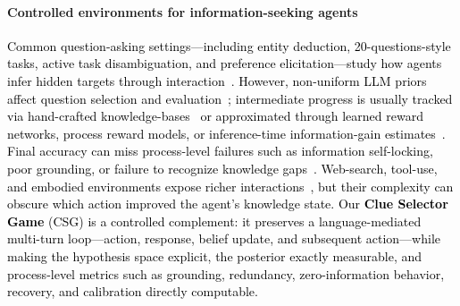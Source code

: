 \documentclass[11pt]{article}
\newcommand{\an}[1]{\textcolor{black}{#1}}
\theoremstyle{plain}
\theoremstyle{definition}
\theoremstyle{remark}
\begin{document}
 
\vspace*{-3mm}
\paragraph{Controlled environments for information-seeking agents}
 
\an{Common question-asking settings---including entity deduction, 20-questions-style tasks, active task disambiguation, and preference elicitation---study how agents infer hidden targets through interaction~\citep{andukuri2024stargateteachinglanguagemodels,kobalczyk2025activetaskdisambiguationllms,lialfa,zhang-etal-2024-probing,zhou2024archer}. However, non-uniform LLM priors affect question selection and evaluation~\citep{mazzaccara-etal-2024-learning}; intermediate progress is usually tracked via hand-crafted knowledge-bases~\citep{zhao2016towards} or approximated through learned reward networks, process reward models, or inference-time information-gain estimates~\citep{choudhury2025bed,choudhury2025processrewardmodelsllm,hu2026playing20questiongame,lee2025prints}. Final accuracy can miss process-level failures such as information self-locking, poor grounding, or failure to recognize knowledge gaps~\citep{shao2025llm,zou2026informationselflockingreinforcementlearning}. Web-search, tool-use, and embodied environments expose richer interactions~\citep{bae2025alignsearchbeliefguidedexploratory,hua2026learningexplorescalingagentic,jinsearch,rezende2014stochastic,song2026large}, but their complexity can obscure which action improved the agent's knowledge state. Our \textbf{Clue Selector Game} (CSG) is a controlled complement: it preserves a language-mediated multi-turn loop---action, response, belief update, and subsequent action---while making the hypothesis space explicit, the posterior exactly measurable, and process-level metrics such as grounding, redundancy, zero-information behavior, recovery, and calibration directly computable.}
 

 
\end{document}
